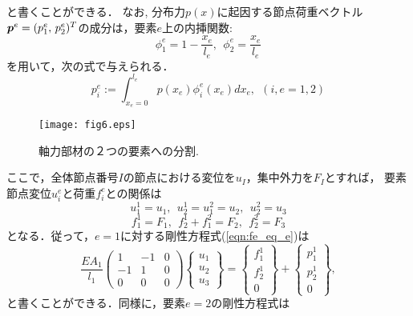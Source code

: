 \documentclass[10pt,a4j]{jarticle}
\begin{document}
と書くことができる．
なお, 分布力$p(x)$に起因する節点荷重ベクトル$\mbox{\boldmath $p$}^e=(p^e_1,\, p^e_2)^T$の成分は，要素$e$上の内挿関数:
\begin{equation}
	\phi^e_1=1-\frac{x_e}{l_e}, \ \ 
	\phi^e_2=\frac{x_e}{l_e} 
\end{equation}
を用いて，次の式で与えられる．
\begin{equation}
	p^e_i:=\int_{x_e=0}^{l_e}p(x_e)\phi^e_i(x_e)dx_e, \ \ (i,e=1,2)
\end{equation}
\begin{figure}[h]
	\begin{center}
	\texttt{[image: fig6.eps]} 
	\end{center}
	\caption{軸力部材の２つの要素への分割.} 
	\label{fig:fig6}
\end{figure}
ここで，全体節点番号$I$の節点における変位を$u_I$，集中外力を$F_I$とすれば，
要素節点変位$u^e_i$と荷重$f^e_i$との関係は
\begin{equation}
	u^1_1=u_1, \ \ u^1_2=u^2_1=u_2, \ \ u^2_2=u_3
	\label{eqn:ui2uI}
\end{equation}
\begin{equation}
	f^1_1=F_1, \ \ f^1_2+f^2_1=F_2, \ \ f^2_2=F_3
	\label{eqn:fi2FI}
\end{equation}
となる．従って，$e=1$に対する剛性方程式(\ref{eqn:fe_eq_e})は
\begin{equation}
	\frac{EA_1}{l_1}
	\left(
	\begin{array}{ccc}
		1 & -1 & 0 \\
		-1 & 1  & 0 \\
		0 & 0  & 0 
	\end{array}
	\right)
	\left\{
	\begin{array}{c}
		u_1 \\
		u_2 \\
		u_3
	\end{array}
	\right\}
	=
	\left\{
	\begin{array}{c}
		f^1_1  \\
		f^1_2  \\
		0
	\end{array}
	\right\}
	+
	\left\{
	\begin{array}{c}
		p^1_1 \\
		p^1_2 \\
		0
	\end{array}
	\right\}, 
	\label{eqn:fe_eq_1}
\end{equation}
と書くことができる．同様に，要素$e=2$の剛性方程式は
\end{document}
